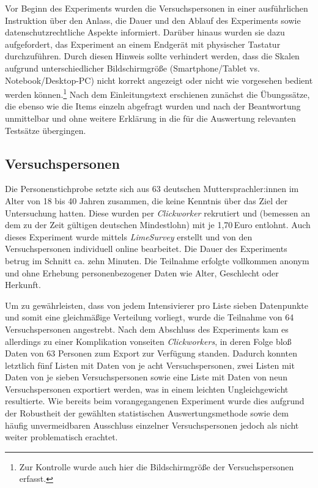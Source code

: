 Vor Beginn des Experiments wurden die Versuchspersonen in einer ausführlichen Instruktion über den Anlass, die Dauer und den Ablauf des Experiments sowie datenschutzrechtliche Aspekte informiert. Darüber hinaus wurden sie dazu aufgefordert, das Experiment an einem Endgerät mit physischer Tastatur durchzuführen. Durch diesen Hinweis sollte verhindert werden, dass die Skalen aufgrund unterschiedlicher Bildschirmgröße (Smartphone/Tablet vs. Notebook/Desktop-PC) nicht korrekt angezeigt oder nicht wie vorgesehen bedient werden können.\footnote{Zur Kontrolle wurde auch hier die Bildschirmgröße der Versuchspersonen erfasst.} Nach dem Einleitungstext erschienen zunächst die Übungssätze, die ebenso wie die Items einzeln abgefragt wurden und nach der Beantwortung unmittelbar und ohne weitere Erklärung in die für die Auswertung relevanten Testsätze übergingen.




\subsection{Versuchspersonen}\label{abs:Versuchspersonen2}
Die Personenstichprobe setzte sich aus 63 deutschen Muttersprachler:innen im Alter von 18 bis 40 Jahren zusammen, die keine Kenntnis über das Ziel der Untersuchung hatten. Diese wurden per \textit{Clickworker} rekrutiert und (bemessen an dem zu der Zeit gültigen deutschen Mindestlohn) mit je 1,70\,Euro entlohnt.
Auch dieses Experiment wurde mittels \textit{LimeSurvey} erstellt und von den Versuchspersonen individuell online bearbeitet. Die Dauer des Experiments betrug im Schnitt ca. zehn Minuten. Die Teilnahme erfolgte vollkommen anonym und ohne Erhebung personenbezogener Daten wie Alter, Geschlecht oder Herkunft.


Um zu gewährleisten, dass von jedem Intensivierer pro Liste sieben Datenpunkte und somit eine gleichmäßige Verteilung vorliegt, wurde die Teilnahme von 64 Versuchspersonen angestrebt. Nach dem Abschluss des Experiments kam es allerdings zu einer Komplikation vonseiten \textit{Clickworkers}, in deren Folge bloß Daten von 63 Personen zum Export zur Verfügung standen. Dadurch konnten letztlich fünf Listen mit Daten von je acht Versuchspersonen, zwei Listen mit Daten von je sieben Versuchspersonen sowie eine Liste mit Daten von neun Versuchspersonen exportiert werden, was in einem leichten Ungleichgewicht resultierte. Wie bereits beim vorangegangenen Experiment wurde dies aufgrund der Robustheit der gewählten statistischen Auswertungsmethode sowie dem häufig unvermeidbaren Ausschluss einzelner Versuchspersonen jedoch als nicht weiter problematisch erachtet.




